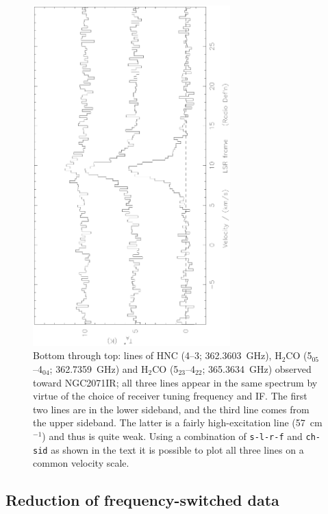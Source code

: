 \documentclass[11pt,twoside]{article}
\begin{document}
\begin{figure}[htb]
\centering
\includegraphics[angle=-90,width=3.0in]{sc8_s-l-r-f.ps}
\vspace*{-0.5cm}
\begin{center}
\begin{minipage}[t]{5.5in}
\caption[Using s-l-r-f etc]
{\small{Bottom through top: lines of HNC (4--3; 362.3603~GHz), H$_2$CO
(5$_{05}$--4$_{04}$; 362.7359~GHz) and H$_2$CO (5$_{23}$--4$_{22}$;
365.3634~GHz) observed toward NGC2071IR; all three lines appear in the
same spectrum by virtue of the choice of receiver tuning frequency and
IF. The first two lines are in the lower sideband, and the
third line comes from the upper sideband. The latter is a fairly
high-excitation line (57~cm$^{-1}$) and thus is quite weak. Using a
combination of {\tt s-l-r-f} and {\tt ch-sid} as shown in the text it
is possible to plot all three lines on a common velocity scale.
}}
\label{fig:s-l-r-f}
\end{minipage}
\end{center}
\end{figure}



\subsection{Reduction of frequency-switched data}
\label{sec:fsw-reduction}
\end{document}

